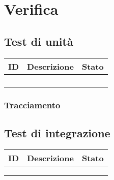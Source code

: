 {{{{{{{{{    

\begin{comment}
    {\renewcommand{\arraystretch}{1.5}
    \begin{tabularx}{\textwidth}{p{0.05\textwidth}|p{0.35\textwidth}|X|X}
    \textbf{ID} & \textbf{Nome metrica} & \textbf{Valore accettabile} & \textbf{Valore ottimale}  \\
    \hline
    \multicolumn{4}{l}{\cellcolor{primarycolor}\textbf{\textit{Gestione organizzativa}}} \\
    \hline
     &  &  &  \\
    \end{tabularx}}  
\end{comment}




\newpage
\section{Verifica}


\subsection{Test di unità}
    {\renewcommand{\arraystretch}{1.5}
    \begin{tabularx}{\textwidth}{p{}|p{}|X}
    \textbf{ID} & \textbf{Descrizione} & \textbf{Stato}  \\
    \hline
     &  & \\
    \hline
     &  &  \\
    \hline
     &  & \\
    \hline
     &  &  \\
    \end{tabularx}}
    \subsubsection{Tracciamento}
    
\subsection{Test di integrazione}
    {\renewcommand{\arraystretch}{1.5}
    \begin{tabularx}{\textwidth}{p{}|p{}|X}
    \textbf{ID} & \textbf{Descrizione} & \textbf{Stato}  \\
    \hline
     &  & \\
    \hline
     &  &  \\
    \hline
     &  & \\
    \end{tabularx}}
}}}}}}}}}
